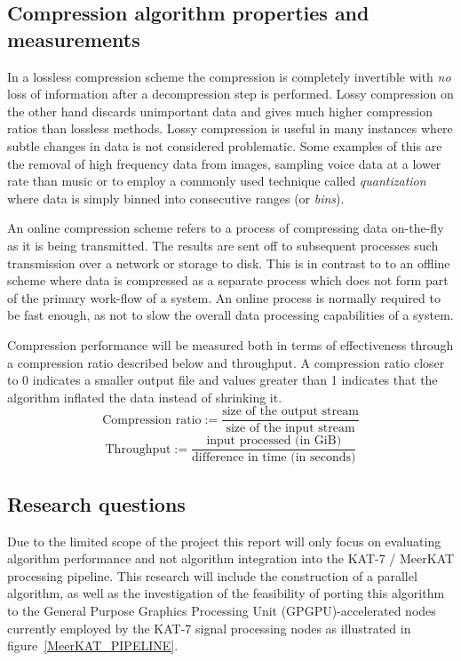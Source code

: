 \subsection{Compression algorithm properties and measurements}
In a lossless compression scheme the compression is completely invertible with \textit{no} loss of information after a decompression step is performed. Lossy
compression on the other hand discards unimportant data and gives much higher compression ratios than lossless methods. Lossy compression is useful in many
instances where subtle changes in data is not considered problematic. Some examples of this are the removal of high frequency data from images, sampling 
voice data at a lower rate than music or to employ a commonly used technique called \textit{quantization} where data is simply binned into consecutive ranges 
(or \textit{bins}).

An online compression scheme refers to a process of compressing data on-the-fly as it is being transmitted. The results are sent off to subsequent 
processes such transmission over a network or storage to disk. This is in contrast to to an offline scheme where data is compressed as a separate process which does not
form part of the primary work-flow of a system. An online process is normally required to be fast enough, as not to slow the overall data processing capabilities of 
a system.

Compression performance will be measured both in terms of effectiveness through a compression ratio described below \cite[p. 10]{salomon2004data} and throughput. A 
compression ratio closer to 0 indicates a smaller output file and values greater than 1 indicates that the algorithm inflated the data instead of shrinking it.
\begin{equation}
 \text{Compression ratio} := \frac{\text{size of the output stream}}{\text{size of the input stream}}
\end{equation}
\begin{equation}
 \text{Throughput} := \frac{\text{input processed (in GiB)}}{\text{difference in time (in seconds)}}
\end{equation}
\subsection{Research questions}
Due to the limited scope of the project this report will only focus on evaluating algorithm performance and not algorithm integration into the KAT-7 / MeerKAT processing
pipeline. This research will include the construction of a parallel algorithm, as well as the investigation of the feasibility of porting this algorithm to the General 
Purpose Graphics Processing Unit (GPGPU)-accelerated nodes currently employed by the KAT-7 signal processing nodes as illustrated in figure~\ref{MeerKAT_PIPELINE}.

